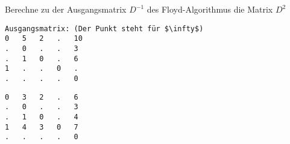 ﻿\question[4]
Berechne zu der Ausgangsmatrix $D^{-1}$ des Floyd-Algorithmus
die Matrix $D^2$
\begin{lstlisting}
Ausgangsmatrix: (Der Punkt steht für $\infty$)
0   5   2   .   10
.   0   .   .   3
.   1   0   .   6
1   .   .   0   .
.   .   .   .   0
\end{lstlisting}

\begin{solutionbox}{4cm}
\begin{lstlisting}
0   3   2   .   6
.   0   .   .   3
.   1   0   .   4
1   4   3   0   7
.   .   .   .   0
\end{lstlisting}
\end{solutionbox}
